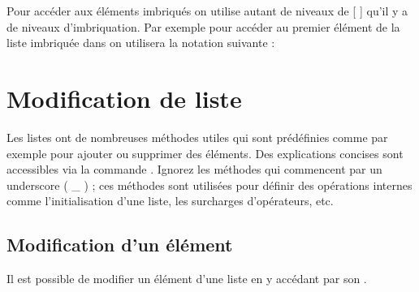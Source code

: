\documentclass[letterpaper,10pt,english]{sphinxmanual}
\begin{document}
\begin{sphinxVerbatim}[commandchars=\\\{\}]
  \PYG{p}{[}       \PYG{p}{]}
\end{sphinxVerbatim}

Pour accéder aux éléments imbriqués on utilise autant de niveaux de {[} {]} qu’il y a de niveaux d’imbriquation.
Par exemple pour accéder au premier élément de la liste  imbriquée dans  on utilisera la notation suivante :

\begin{sphinxVerbatim}[commandchars=\\\{\}]
\PYG{p}{[}\PYG{p}{]}\PYG{p}{[}\PYG{p}{]}
\end{sphinxVerbatim}


\section{Modification de liste}
\label{\detokenize{src/OCI02_Listes:modification-de-liste}}
Les listes ont de nombreuses méthodes utiles qui sont prédéfinies comme par exemple pour ajouter ou supprimer des éléments.
Des explications concises sont accessibles via la commande .
Ignorez les méthodes qui commencent par un underscore ( \_ ) ; ces méthodes sont utilisées pour définir des opérations internes comme l’initialisation d’une liste, les surcharges d’opérateurs, etc.


\subsection{Modification d’un élément}
\label{\detokenize{src/OCI02_Listes:modification-d-un-element}}
Il est possible de modifier un élément d’une liste en y accédant par son .
\end{document}
